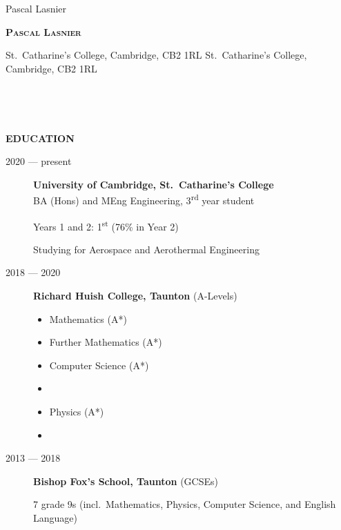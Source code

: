 \documentclass[
  11pt,
  a4paper,
]{article}
\author{}
\date{}
\makeatletter
\providecommand{\tightlist}{%
  \setlength{\itemsep}{0pt}\setlength{\parskip}{0pt}}
\newcommand{\ruledheader}[2]{%
\begingroup
\setlength{\fboxsep}{0pt}%
\colorbox{#1}{%
\parbox[b][1.2ex][t]{35mm}{\begin{tiny}\ \end{tiny}}}%
\parbox[b][1.2ex][t]{5mm}{\begin{tiny}\ \end{tiny}}%
\uppercase{\textbf{#2}}
\endgroup}
\newcommand{\name}{Pascal Lasnier}
\newcommand{\email}{py@lasnier.com}
\newcommand{\phone}{+44 7521 986848}
\newcommand{\website}{github.com/pylasnier}
\newcommand{\address}{St.~Catharine's College, Cambridge, CB2 1RL}
\makeatother
\begin{document}
\ifdefined\name
\begin{Huge}
\hspace{8mm}
\textsc{\textbf{\name}}
\end{Huge}
\fi

\vspace{-7.5mm}

\begin{flushright}
\mbox{\rule[-6mm]{0.8pt}{14mm}\hspace{3mm}%
\parbox{40mm}{\email\\\phone\\\website}}
\end{flushright}

\ifdefined\address
\vspace{-1.2ex}
\hspace{8mm}
\address
\fi

\begin{Large}\vspace{2ex}

\ruledheader{cyan!50!teal}{Education}\end{Large}

\begin{description}
\item[2020 --- present]
\textbf{University of Cambridge, St.~Catharine's College}\\
BA (Hons) and MEng Engineering, 3\textsuperscript{rd} year student

Years 1 and 2: 1\textsuperscript{st} (76\% in Year 2)

Studying for Aerospace and Aerothermal Engineering
\item[2018 --- 2020]
\textbf{Richard Huish College, Taunton} (A-Levels)

\begingroup
\begin{multicols}{3}

\begin{itemize}
\tightlist
\item
  Mathematics (A*)
\item
  Further Mathematics (A*)
\item
  Computer Science (A*)
\item
\item
  Physics (A*)
\item
\end{itemize}

\end{multicols}
\vspace{-\parskip}\endgroup
\item[2013 --- 2018]
\textbf{Bishop Fox's School, Taunton} (GCSEs)

7 grade 9s (incl.~Mathematics, Physics, Computer Science, and English
Language)
\end{description}
\end{document}
